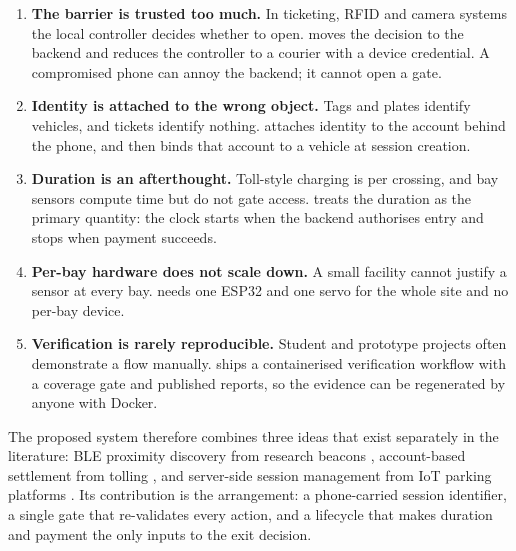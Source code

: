 \begin{enumerate}
  \item \textbf{The barrier is trusted too much.} In ticketing, RFID and camera
        systems the local controller decides whether to open. \project{} moves the
        decision to the backend and reduces the controller to a courier with a
        device credential. A compromised phone can annoy the backend; it cannot open
        a gate.
  \item \textbf{Identity is attached to the wrong object.} Tags and plates identify
        vehicles, and tickets identify nothing. \project{} attaches identity to the
        account behind the phone, and then binds that account to a vehicle at
        session creation.
  \item \textbf{Duration is an afterthought.} Toll-style charging is per crossing,
        and bay sensors compute time but do not gate access. \project{} treats the
        duration as the primary quantity: the clock starts when the backend
        authorises entry and stops when payment succeeds.
  \item \textbf{Per-bay hardware does not scale down.} A small facility cannot
        justify a sensor at every bay. \project{} needs one ESP32 and one servo for
        the whole site and no per-bay device.
  \item \textbf{Verification is rarely reproducible.} Student and prototype
        projects often demonstrate a flow manually. \project{} ships a containerised
        verification workflow with a coverage gate and published reports, so the
        evidence can be regenerated by anyone with Docker.
\end{enumerate}

The proposed system therefore combines three ideas that exist separately in the
literature: BLE proximity discovery from research beacons \cite{mackey2020},
account-based settlement from tolling \cite{npci2024}, and server-side session
management from IoT parking platforms \cite{alam2023}. Its contribution is the
arrangement: a phone-carried session identifier, a single gate that re-validates
every action, and a lifecycle that makes duration and payment the only inputs to
the exit decision.


